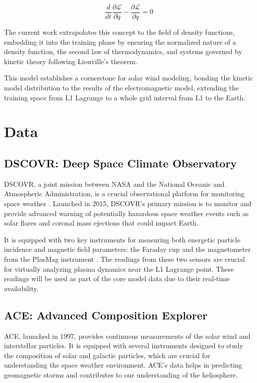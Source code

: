 \documentclass[12pt]{article}
\begin{document}
\begin{equation}
    \frac{d}{dt} \frac{\partial \mathcal{L}}{\partial \dot q} - \frac{\partial \mathcal{L}}{\partial q} = 0
\end{equation}

The current work extrapolates this concept to the field of density functions, embedding it into the training phase by ensuring the normalized nature of a density function, the second law of thermodynamics, and systems governed by kinetic theory following Liouville's theorem.

This model establishes a cornerstone for solar wind modeling, bonding the kinetic model distribution to the results of the electromagnetic model, extending the training space from     L1 Lagrange to a whole grid interval from L1 to the Earth.

\section{Data}

\subsection{DSCOVR: Deep Space Climate Observatory}
DSCOVR, a joint mission between NASA and the National Oceanic and Atmospheric Administration, is a crucial observational platform for monitoring space weather \cite{nasa_dscovr}. Launched in 2015, DSCOVR's primary mission is to monitor and provide advanced warning of potentially hazardous space weather events such as solar flares and coronal mass ejections that could impact Earth.

It is equipped with two key instruments for measuring both energetic particle incidence and magnetic field parameters: the Faraday cup and the magnetometer from the PlasMag instrument \cite{nasa_dscovr}. The readings from these two sensors are crucial for virtually analyzing plasma dynamics near the L1 Lagrange point. These readings will be used as part of the core model data due to their real-time availability.

\subsection{ACE: Advanced Composition Explorer}
ACE, launched in 1997, provides continuous measurements of the solar wind and interstellar particles. It is equipped with several instruments designed to study the composition of solar and galactic particles, which are crucial for understanding the space weather environment. ACE's data helps in predicting geomagnetic storms and contributes to our understanding of the heliosphere.
\end{document}
